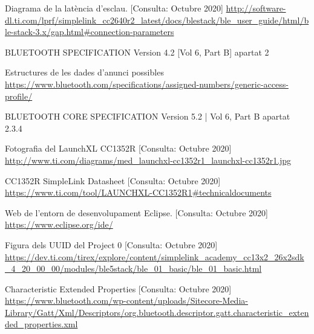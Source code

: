 \begin{thebibliography}{2}
Diagrama de la latència d'esclau.
[Consulta: Octubre 2020] \newline
\href{http://software-dl.ti.com/lprf/simplelink\_cc2640r2\_latest/docs/blestack/ble\_user\_guide/html/ble-stack-3.x/gap.html\#connection-parameters}{http://software-dl.ti.com/lprf/simplelink\_cc2640r2\_latest/docs/blestack/ble\_user\_guide/html/ble-stack-3.x/gap.html\#connection-parameters}

BLUETOOTH SPECIFICATION Version 4.2 [Vol 6, Part B] apartat 2 

Estructures de les dades d'anunci possibles \newline
\href{https://www.bluetooth.com/specifications/assigned-numbers/generic-access-profile/}{https://www.bluetooth.com/specifications/assigned-numbers/generic-access-profile/}

BLUETOOTH CORE SPECIFICATION Version 5.2 | Vol 6, Part B apartat 2.3.4

Fotografia del LaunchXL CC1352R
[Consulta: Octubre 2020]\newline
\href{http://www.ti.com/diagrams/med_launchxl-cc1352r1_launchxl-cc1352r1.jpg}{http://www.ti.com/diagrams/med\_launchxl-cc1352r1\_launchxl-cc1352r1.jpg}

CC1352R SimpleLink Datasheet
[Consulta: Octubre 2020]\newline
\href{https://www.ti.com/tool/LAUNCHXL-CC1352R1\#technicaldocuments}{https://www.ti.com/tool/LAUNCHXL-CC1352R1\#technicaldocuments}

Web de l'entorn de desenvolupament Eclipse.
[Consulta: Octubre 2020] \newline
\href{https://www.eclipse.org/ide/}{https://www.eclipse.org/ide/}

Figura dels UUID del Project 0 [Consulta: Octubre 2020]\newline
\href{https://dev.ti.com/tirex/explore/content/simplelink_academy_cc13x2_26x2sdk_4_20_00_00/modules/ble5stack/ble_01_basic/ble_01_basic.html}{https://dev.ti.com/tirex/explore/content/simplelink\_academy\_cc13x2\_26x2sdk\_4\_20\_00\_00/modules/ble5stack/ble\_01\_basic/ble\_01\_basic.html}


Characteristic Extended Properties
[Consulta: Octubre 2020]\newline
\href{https://www.bluetooth.com/wp-content/uploads/Sitecore-Media-Library/Gatt/Xml/Descriptors/org.bluetooth.descriptor.gatt.characteristic_extended_properties.xml}{https://www.bluetooth.com/wp-content/uploads/Sitecore-Media-Library/Gatt/Xml/Descriptors/org.bluetooth.descriptor.gatt.characteristic\_extended\_properties.xml}


\end{thebibliography}
